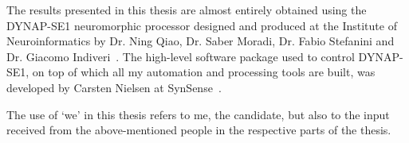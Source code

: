 The results presented in this thesis are almost entirely obtained using the DYNAP-SE1 neuromorphic processor designed and produced at the Institute of Neuroinformatics by Dr. Ning Qiao, Dr. Saber Moradi, Dr. Fabio Stefanini and Dr. Giacomo Indiveri~\cite{Moradi_etal18}. The high-level software package used to control DYNAP-SE1, on top of which all my automation and processing tools are built, was developed by Carsten Nielsen at SynSense~\cite{Samna}.

The use of ‘we’ in this thesis refers to me, the candidate, but also to the input received from the above-mentioned people in the respective parts of the thesis.

\newpage



\bigskip










